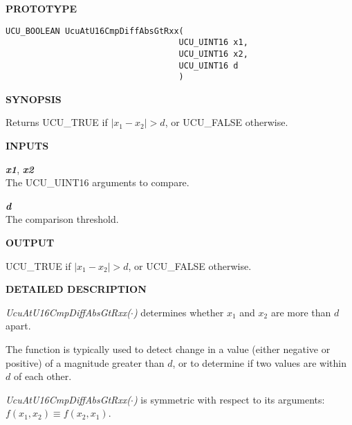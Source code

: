 %

\noindent\textbf{PROTOTYPE}
\begin {list}{}{\setlength{\leftmargin}{0.25in}\setlength{\topsep}{0.0in}}
\item
\begin{verbatim}
UCU_BOOLEAN UcuAtU16CmpDiffAbsGtRxx(
                                   UCU_UINT16 x1,
                                   UCU_UINT16 x2,
                                   UCU_UINT16 d
                                   )
\end{verbatim}
\end{list}
\vspace{2.8ex}

\noindent\textbf{SYNOPSIS}
\begin{list}{}{\setlength{\leftmargin}{0.25in}\setlength{\topsep}{0.0in}}
\item Returns UCU\_TRUE if $|x_1-x_2|>d$, or UCU\_FALSE otherwise.
\end{list}
\vspace{2.8ex}

\noindent\textbf{INPUTS}
\begin{list}{}{\setlength{\leftmargin}{0.5in}\setlength{\itemindent}{-0.25in}\setlength{\topsep}{0.0in}\setlength{\partopsep}{0.0in}}
\item \emph{\textbf{x1}}, \emph{\textbf{x2}}\\
      The UCU\_UINT16 arguments to compare.
\item \emph{\textbf{d}}\\
      The comparison threshold.
\end{list}
\vspace{2.8ex}

\noindent\textbf{OUTPUT}
\begin{list}{}{\setlength{\leftmargin}{0.25in}\setlength{\topsep}{0.0in}}
\item UCU\_TRUE if $|x_1-x_2|>d$, or UCU\_FALSE otherwise.
\end{list}
\vspace{2.8ex}

\noindent\textbf{DETAILED DESCRIPTION}
\begin{list}{}{\setlength{\leftmargin}{0.25in}\setlength{\topsep}{0.0in}}
\item \emph{UcuAtU16CmpDiffAbsGtRxx($\cdot$)} determines whether 
      $x_1$ and $x_2$ are more than $d$ apart.
\item The function is
      typically used to detect change in a value (either negative or positive)
      of a magnitude greater than $d$,
      or to determine if two values are within $d$ of each other.
\item \emph{UcuAtU16CmpDiffAbsGtRxx($\cdot$)} is symmetric with
      respect to its arguments:  $f(x_1, x_2) \equiv f(x_2, x_1)$.
\end{list}
\vspace{2.8ex}

